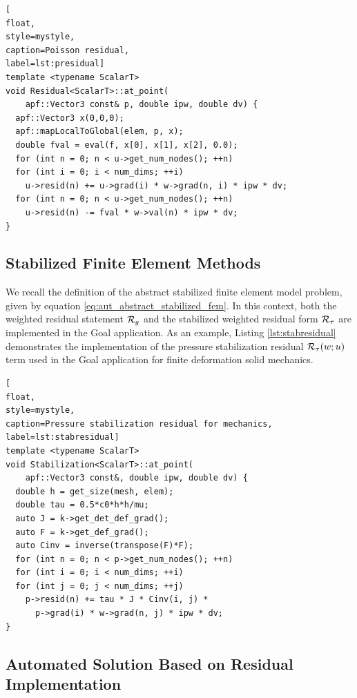 \begin{lstlisting}[
float,
style=mystyle,
caption=Poisson residual,
label=lst:presidual]
template <typename ScalarT>
void Residual<ScalarT>::at_point(
    apf::Vector3 const& p, double ipw, double dv) {
  apf::Vector3 x(0,0,0);
  apf::mapLocalToGlobal(elem, p, x);
  double fval = eval(f, x[0], x[1], x[2], 0.0);
  for (int n = 0; n < u->get_num_nodes(); ++n)
  for (int i = 0; i < num_dims; ++i)
    u->resid(n) += u->grad(i) * w->grad(n, i) * ipw * dv;
  for (int n = 0; n < u->get_num_nodes(); ++n)
    u->resid(n) -= fval * w->val(n) * ipw * dv;
}
\end{lstlisting}

\subsection{Stabilized Finite Element Methods}

We recall the definition of the abstract stabilized finite element model
problem, given by equation \eqref{eq:aut_abstract_stabilized_fem}. In this
context, both the weighted residual statement $\mathcal{R}_g$ and the stabilized
weighted residual form $\mathcal{R}_{\tau}$ are implemented in the Goal application.
As an example, Listing \ref{lst:stabresidual} demonstrates the implementation
of the pressure stabilization \cite{ramesh2005stabilized} residual
$\mathcal{R}_{\tau}(w; u)$ term used in the Goal application for finite deformation
solid mechanics.

\begin{lstlisting}[
float,
style=mystyle,
caption=Pressure stabilization residual for mechanics,
label=lst:stabresidual]
template <typename ScalarT>
void Stabilization<ScalarT>::at_point(
    apf::Vector3 const&, double ipw, double dv) {
  double h = get_size(mesh, elem);
  double tau = 0.5*c0*h*h/mu;
  auto J = k->get_det_def_grad();
  auto F = k->get_def_grad();
  auto Cinv = inverse(transpose(F)*F);
  for (int n = 0; n < p->get_num_nodes(); ++n)
  for (int i = 0; i < num_dims; ++i)
  for (int j = 0; j < num_dims; ++j)
    p->resid(n) += tau * J * Cinv(i, j) *
      p->grad(i) * w->grad(n, j) * ipw * dv;
}
\end{lstlisting}

\subsection{Automated Solution Based on Residual Implementation}


